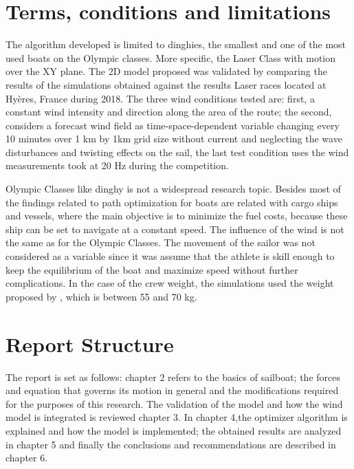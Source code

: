  \section{Terms, conditions and limitations}
The algorithm developed is limited to dinghies, the smallest and one of the most used boats on the Olympic classes. More specific, the Laser Class with motion over the XY plane.  The 2D model proposed was validated by comparing the results of the simulations obtained against the results Laser races located at Hyères, France during 2018. The three wind conditions tested are: first, a constant wind intensity and direction along the area of the route; the second, considers a forecast wind field as time-space-dependent variable changing every 10 minutes over 1 km by 1km grid size without current and neglecting the wave disturbances and twisting effects on the sail, the last test condition uses the wind measurements took at 20 Hz during the competition. \par 

Olympic Classes like dinghy is not a widespread research topic. Besides most of the findings related to path optimization for boats are related with cargo ships and vessels, where the main objective is to minimize the fuel costs, because these ship can be set to navigate at a constant speed. The influence of the wind is not the same as for the Olympic Classes. The movement of the sailor was not considered as a variable since it was assume that the athlete is skill enough to keep the equilibrium of the boat and  maximize speed without further complications. In the case of the crew weight, the simulations used the weight proposed by \cite{laser_opt}, which is between	55 and 70 kg.\par 

 
 \section{Report Structure}
The report is set as follows: chapter 2 refers to the basics of sailboat; the forces and equation that governs its motion in general and the modifications required for the purposes of this research. The validation of the model and how the wind model is integrated is reviewed chapter 3. In chapter 4,the optimizer algorithm is explained and how the model is implemented;  the obtained results are analyzed in chapter 5 and finally the conclusions and recommendations are described in chapter 6.\par 

